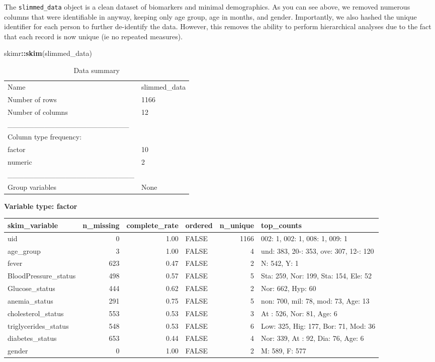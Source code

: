 \documentclass[]{article}
\newenvironment{Shaded}{\begin{snugshade}}{\end{snugshade}}
\newcommand{\KeywordTok}[1]{\textcolor[rgb]{0.13,0.29,0.53}{\textbf{#1}}}
\newcommand{\NormalTok}[1]{#1}
\newcommand{\OperatorTok}[1]{\textcolor[rgb]{0.81,0.36,0.00}{\textbf{#1}}}
\begin{document}
The \texttt{slimmed\_data} object is a clean dataset of biomarkers and
minimal demographics. As you can see above, we removed numerous columns
that were identifiable in anyway, keeping only age group, age in months,
and gender. Importantly, we also hashed the unique identifier for each
person to further de-identify the data. However, this removes the
ability to perform hierarchical analyses due to the fact that each
record is now unique (ie no repeated measures).

\begin{Shaded}
\begin{Highlighting}[]
\NormalTok{skimr}\OperatorTok{::}\KeywordTok{skim}\NormalTok{(slimmed_data)}
\end{Highlighting}
\end{Shaded}

\begin{longtable}[]{@{}ll@{}}
\caption{Data summary}\tabularnewline
\toprule
\endhead
Name & slimmed\_data\tabularnewline
Number of rows & 1166\tabularnewline
Number of columns & 12\tabularnewline
\_\_\_\_\_\_\_\_\_\_\_\_\_\_\_\_\_\_\_\_\_\_\_ &\tabularnewline
Column type frequency: &\tabularnewline
factor & 10\tabularnewline
numeric & 2\tabularnewline
\_\_\_\_\_\_\_\_\_\_\_\_\_\_\_\_\_\_\_\_\_\_\_\_ &\tabularnewline
Group variables & None\tabularnewline
\bottomrule
\end{longtable}

\textbf{Variable type: factor}

\begin{longtable}[]{@{}lrrlrl@{}}
\toprule
skim\_variable & n\_missing & complete\_rate & ordered & n\_unique &
top\_counts\tabularnewline
\midrule
\endhead
uid & 0 & 1.00 & FALSE & 1166 & 002: 1, 002: 1, 008: 1, 009:
1\tabularnewline
age\_group & 3 & 1.00 & FALSE & 4 & und: 383, 20-: 353, ove: 307, 12-:
120\tabularnewline
fever & 623 & 0.47 & FALSE & 2 & N: 542, Y: 1\tabularnewline
BloodPressure\_status & 498 & 0.57 & FALSE & 5 & Sta: 259, Nor: 199,
Sta: 154, Ele: 52\tabularnewline
Glucose\_status & 444 & 0.62 & FALSE & 2 & Nor: 662, Hyp:
60\tabularnewline
anemia\_status & 291 & 0.75 & FALSE & 5 & non: 700, mil: 78, mod: 73,
Age: 13\tabularnewline
cholesterol\_status & 553 & 0.53 & FALSE & 3 & At : 526, Nor: 81, Age:
6\tabularnewline
triglycerides\_status & 548 & 0.53 & FALSE & 6 & Low: 325, Hig: 177,
Bor: 71, Mod: 36\tabularnewline
diabetes\_status & 653 & 0.44 & FALSE & 4 & Nor: 339, At : 92, Dia: 76,
Age: 6\tabularnewline
gender & 0 & 1.00 & FALSE & 2 & M: 589, F: 577\tabularnewline
\bottomrule
\end{longtable}
\end{document}
